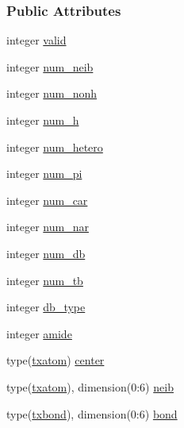 \subsubsection*{Public Attributes}
\begin{DoxyCompactItemize}
\item 
integer \hyperlink{structcalc__xscore_1_1txgroup_ad1283f414fe9446823fba548f572469c}{valid}
\item 
integer \hyperlink{structcalc__xscore_1_1txgroup_a57ed3dcde360ecbd340b61712c2c7a0b}{num\-\_\-neib}
\item 
integer \hyperlink{structcalc__xscore_1_1txgroup_a32e05698a71d3ed8d86282cabad31dab}{num\-\_\-nonh}
\item 
integer \hyperlink{structcalc__xscore_1_1txgroup_a0741e966fd494a4645be9d1ecd78c494}{num\-\_\-h}
\item 
integer \hyperlink{structcalc__xscore_1_1txgroup_aaa166c37c6d2767d4f88059869fc28fb}{num\-\_\-hetero}
\item 
integer \hyperlink{structcalc__xscore_1_1txgroup_a440ae6a57c205e674847d57683f35ae0}{num\-\_\-pi}
\item 
integer \hyperlink{structcalc__xscore_1_1txgroup_ab43d1f98f266fca2fa360c4605fedbb2}{num\-\_\-car}
\item 
integer \hyperlink{structcalc__xscore_1_1txgroup_ac349ef281527337d256bcd98898c4846}{num\-\_\-nar}
\item 
integer \hyperlink{structcalc__xscore_1_1txgroup_ade68eb6db76ca49fbbb32db18bf47627}{num\-\_\-db}
\item 
integer \hyperlink{structcalc__xscore_1_1txgroup_a14b04af12241208595ccd79a129b5f65}{num\-\_\-tb}
\item 
integer \hyperlink{structcalc__xscore_1_1txgroup_abed09b58f368c98556aeb2a36fe549e6}{db\-\_\-type}
\item 
integer \hyperlink{structcalc__xscore_1_1txgroup_a60c13a55e6e3248d12179bf283bcdc36}{amide}
\item 
type(\hyperlink{structcalc__xscore_1_1txatom}{txatom}) \hyperlink{structcalc__xscore_1_1txgroup_a15e0502d233dd624d367cfbbe579ad6c}{center}
\item 
type(\hyperlink{structcalc__xscore_1_1txatom}{txatom}), dimension(0\-:6) \hyperlink{structcalc__xscore_1_1txgroup_aa001da5f22731f7cb5ca4113c407e502}{neib}
\item 
type(\hyperlink{structcalc__xscore_1_1txbond}{txbond}), dimension(0\-:6) \hyperlink{structcalc__xscore_1_1txgroup_abbbdf8d73b2d818111f88d354eef344a}{bond}
\end{DoxyCompactItemize}



